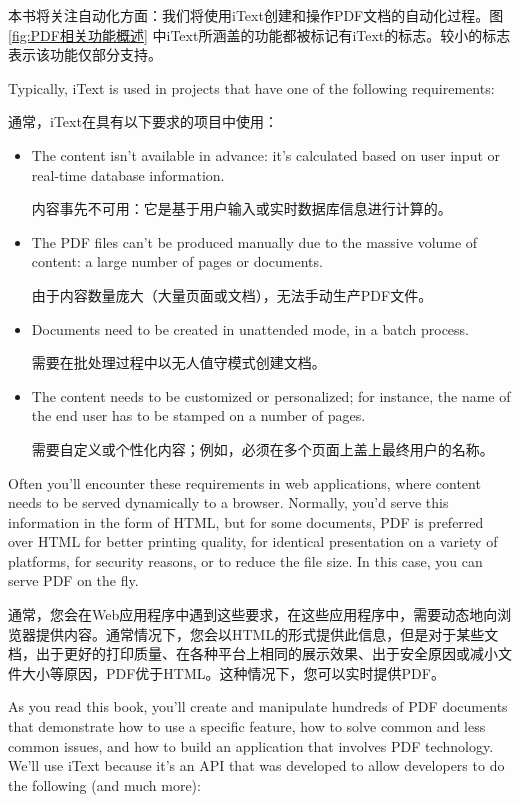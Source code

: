 \documentclass{book}
\begin{document}
本书将关注自动化方面：我们将使用iText创建和操作PDF文档的自动化过程。图 \ref{fig:PDF相关功能概述} 中iText所涵盖的功能都被标记有iText的标志。较小的标志表示该功能仅部分支持。

Typically, iText is used in projects that have one of the following requirements:

通常，iText在具有以下要求的项目中使用：

\begin{itemize}
\item
The content isn’t available in advance: it’s calculated based on user input or real-time database information.

内容事先不可用：它是基于用户输入或实时数据库信息进行计算的。

\item
The PDF files can’t be produced manually due to the massive volume of content: a large number of pages or documents.

由于内容数量庞大（大量页面或文档），无法手动生产PDF文件。

\item
Documents need to be created in unattended mode, in a batch process.

需要在批处理过程中以无人值守模式创建文档。

\item
The content needs to be customized or personalized; for instance, the name of the end user has to be stamped on a number of pages.

需要自定义或个性化内容；例如，必须在多个页面上盖上最终用户的名称。
\end{itemize}
Often you’ll encounter these requirements in web applications, where content needs to be served dynamically to a browser. Normally, you’d serve this information in the form of HTML, but for some documents, PDF is preferred over HTML for better printing quality, for identical presentation on a variety of platforms, for security reasons, or to reduce the file size. In this case, you can serve PDF on the fly.

通常，您会在Web应用程序中遇到这些要求，在这些应用程序中，需要动态地向浏览器提供内容。通常情况下，您会以HTML的形式提供此信息，但是对于某些文档，出于更好的打印质量、在各种平台上相同的展示效果、出于安全原因或减小文件大小等原因，PDF优于HTML。这种情况下，您可以实时提供PDF。

As you read this book, you’ll create and manipulate hundreds of PDF documents that demonstrate how to use a specific feature, how to solve common and less common issues, and how to build an application that involves PDF technology. We’ll use iText because it’s an API that was developed to allow developers to do the following (and much more):
\end{document}
